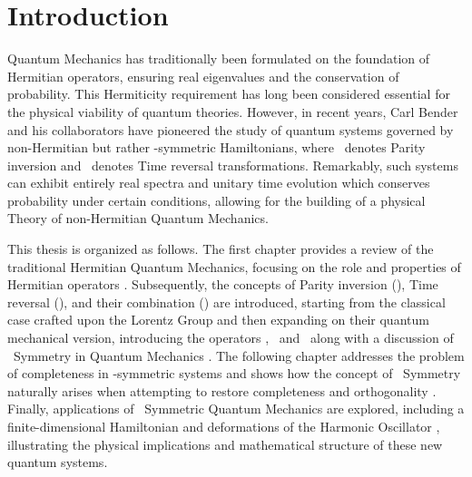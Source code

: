 \chapter{Introduction}\label{ch:introduction}
    Quantum Mechanics has traditionally been formulated on the foundation of Hermitian operators, ensuring real eigenvalues and the conservation of probability. This Hermiticity requirement has long been considered essential for the physical viability of quantum theories. However, in recent years, Carl Bender and his collaborators have pioneered the study of quantum systems governed by non-Hermitian but rather \PT-symmetric Hamiltonians, where \mcP\ denotes Parity inversion and \mcT\ denotes Time reversal transformations. Remarkably, such systems can exhibit entirely real spectra and unitary time evolution which conserves probability under certain conditions, allowing for the building of a physical Theory of non-Hermitian Quantum Mechanics.

    This thesis is organized as follows. The first chapter provides a review of the traditional Hermitian Quantum Mechanics, focusing on the role and properties of Hermitian operators \cite{Shankar2012-kg,Sakurai2020-pu,Bernardini1993-iy}. Subsequently, the concepts of Parity inversion (\mcP), Time reversal (\mcT), and their combination (\PT) are introduced, starting from the classical case crafted upon the Lorentz Group \cite{bender2024} and then expanding on their quantum mechanical version, introducing the operators \hP, \hT\ and \hPT\ along with a discussion of \PT\ Symmetry in Quantum Mechanics \cite{Bender2005,bender2024}. The following chapter addresses the problem of completeness in \PT-symmetric systems and shows how the concept of \CPT\ Symmetry naturally arises when attempting to restore completeness and orthogonality \cite{Bender2007,bender2024,Weigert2003}. Finally, applications of \PT\ Symmetric Quantum Mechanics are explored, including a finite-dimensional Hamiltonian and deformations of the Harmonic Oscillator \cite{Bender1998}, illustrating the physical implications and mathematical structure of these new quantum systems.
